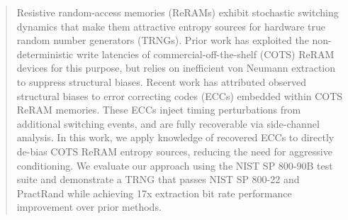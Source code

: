 \begin{abstract}
Resistive random-access memories (ReRAMs) exhibit stochastic switching dynamics that make them attractive entropy sources for hardware true random number generators (TRNGs). Prior work has exploited the non-deterministic write latencies of commercial-off-the-shelf (COTS) ReRAM devices for this purpose, but relies on inefficient von Neumann extraction to suppress structural biases. Recent work has attributed observed structural biases to error correcting codes (ECCs) embedded within COTS ReRAM memories. These ECCs inject timing perturbations from additional switching events, and are fully recoverable via side-channel analysis. In this work, we apply knowledge of recovered ECCs to directly de-bias COTS ReRAM entropy sources, reducing the need for aggressive conditioning. We evaluate our approach using the NIST SP 800-90B test suite and demonstrate a TRNG that passes NIST SP 800-22 and PractRand while achieving 17x extraction bit rate performance improvement over prior methods.
\end{abstract}